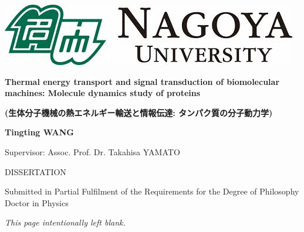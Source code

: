 \documentclass[12pt, oneside]{article}
\begin{document}
\graphicspath{ {figures/titlepage/} }
 
\thispagestyle{empty}
\begin{center}
\begin{minipage}{1\linewidth}
    \centering
    \includegraphics[width=0.5\linewidth]{images.jpeg}\par
    \vspace{1cm}
    {{\Large \textbf {Thermal energy transport and signal transduction of biomolecular machines: Molecule dynamics study of proteins}\par}}
    \begin{CJK}{UTF8}{min}
    {{\Large \textbf {(生体分子機械の熱エネルギー輸送と情報伝達: 
    \newline タンパク質の分子動力学)}\par}}
    \end{CJK}
    \vspace{2cm}
    {\Large \textbf {Tingting WANG}\par}
    \vspace{1cm}
    {\Large Supervisor: Assoc. Prof. Dr. Takahisa YAMATO \par}
    \vspace{1.5cm}
    {\Large DISSERTATION \par
    Submitted in Partial Fulfilment of the Requirements 
    for the Degree of 
    Philosophy Doctor in Physics\par}
    \vspace{1.5cm}
    {\Large  \linespread{1.5}{
    Computational Biophysics Laboratory (B-Lab) \par
    Graduate School of Science \par
    September 2023 \par}}
\end{minipage}
\end{center}
\clearpage

\newpage
\begin{center}
\textit{This page intentionally left blank.}
\end{center}
\thispagestyle{empty}\newpage
\end{document}
